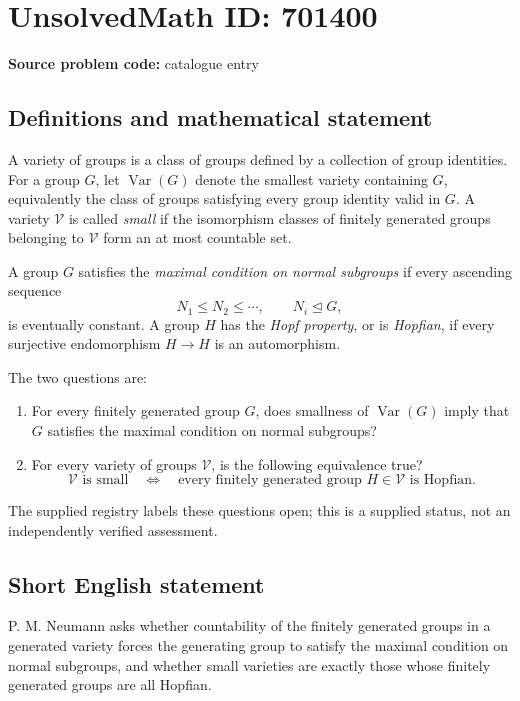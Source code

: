 \documentclass[11pt]{article}
\begin{document}
\section*{UnsolvedMath ID: 701400}
\textbf{Source problem code:} catalogue entry
\subsection{Definitions and mathematical statement}
A variety of groups is a class of groups defined by a collection of group identities. For a group \(G\), let \(\operatorname{Var}(G)\) denote the smallest variety containing \(G\), equivalently the class of groups satisfying every group identity valid in \(G\). A variety \(\mathcal V\) is called \emph{small} if the isomorphism classes of finitely generated groups belonging to \(\mathcal V\) form an at most countable set.

A group \(G\) satisfies the \emph{maximal condition on normal subgroups} if every ascending sequence
\[
N_1\leq N_2\leq\cdots,\qquad N_i\trianglelefteq G,
\]
is eventually constant. A group \(H\) has the \emph{Hopf property}, or is \emph{Hopfian}, if every surjective endomorphism \(H\to H\) is an automorphism.

The two questions are:
\begin{enumerate}
\item[(a)] For every finitely generated group \(G\), does smallness of \(\operatorname{Var}(G)\) imply that \(G\) satisfies the maximal condition on normal subgroups?
\item[(b)] For every variety of groups \(\mathcal V\), is the following equivalence true?
\[
\mathcal V\text{ is small}
\quad\Longleftrightarrow\quad
\text{every finitely generated group }H\in\mathcal V\text{ is Hopfian}.
\]
\end{enumerate}
The supplied registry labels these questions open; this is a supplied status, not an independently verified assessment.
\subsection{Short English statement}
P. M. Neumann asks whether countability of the finitely generated groups in a generated variety forces the generating group to satisfy the maximal condition on normal subgroups, and whether small varieties are exactly those whose finitely generated groups are all Hopfian.
\end{document}
